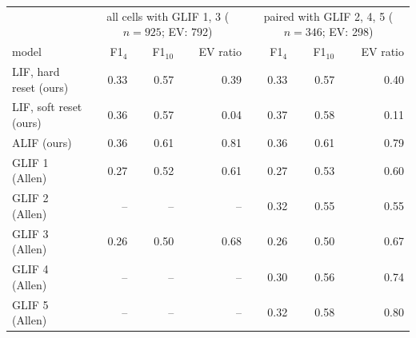\begin{tabular}{lrrrrrr}
\toprule
 & \multicolumn{3}{c}{all cells with GLIF 1, 3 ($n=925$; EV: 792)} & \multicolumn{3}{c}{paired with GLIF 2, 4, 5 ($n=346$; EV: 298)}\\
model & F1$_{4}$ & F1$_{10}$ & EV ratio & F1$_{4}$ & F1$_{10}$ & EV ratio\\
\midrule
LIF, hard reset (ours) & 0.33 & 0.57 & 0.39 & 0.33 & 0.57 & 0.40\\
LIF, soft reset (ours) & 0.36 & 0.57 & 0.04 & 0.37 & 0.58 & 0.11\\
ALIF (ours) & 0.36 & 0.61 & 0.81 & 0.36 & 0.61 & 0.79\\
\midrule
GLIF 1 (Allen) & 0.27 & 0.52 & 0.61 & 0.27 & 0.53 & 0.60\\
GLIF 2 (Allen) & -- & -- & -- & 0.32 & 0.55 & 0.55\\
GLIF 3 (Allen) & 0.26 & 0.50 & 0.68 & 0.26 & 0.50 & 0.67\\
GLIF 4 (Allen) & -- & -- & -- & 0.30 & 0.56 & 0.74\\
GLIF 5 (Allen) & -- & -- & -- & 0.32 & 0.58 & 0.80\\
\bottomrule
\end{tabular}
